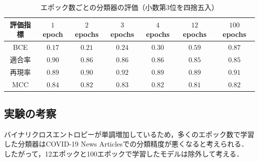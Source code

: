 \documentclass[12pt,a4j,dvipdfmx]{jreport}
\begin{document}
\begin{table}[H]
  \caption{
    エポック数ごとの分類器の評価（小数第3位を四捨五入）
    }
  \centering
  \vspace{4mm}
    \begin{tabular}{ccccccc}
    \hline
    評価指標 & $1$ epoch & $2$ epochs & $3$ epochs & $4$ epochs & $12$ epochs & $100$ epochs
    \\
    \hline
    BCE & $\mathbf{0.17}$ & $0.21$ & $0.24$ & $0.30$ & $0.59$ & $0.87$
    \\
    適合率 & $\mathbf{0.90}$ & $0.86$ & $0.86$ & $0.86$ & $0.85$ & $0.85$
    \\
    再現率 & $0.89$ & $0.90$ & $\mathbf{0.92}$ & $0.89$ & $0.89$ & $0.91$
    \\
    MCC & $\mathbf{0.84}$ & $0.82$ & $0.83$ & $0.82$ & $0.81$ & $0.82$
    \\
    \hline
    \end{tabular}
  \label{ibm_classification_evaluation}
\end{table}

\subsection{実験の考察}
バイナリクロスエントロピーが単調増加しているため，多くのエポック数で学習した分類器はCOVID-19 News Articlesでの分類精度が悪くなると考えられる．
したがって，12エポックと100エポックで学習したモデルは除外して考える．
\end{document}
